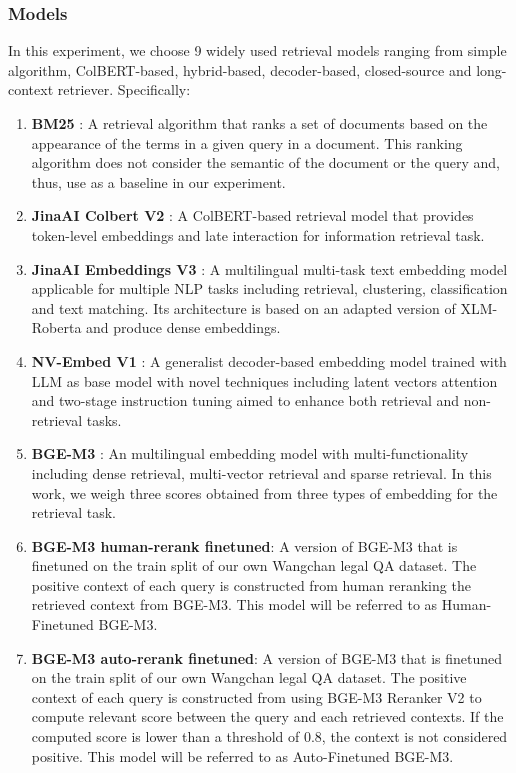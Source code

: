 \subsubsection{Models}
\label{subsubsec:re_models}
In this experiment, we choose 9 widely used retrieval models ranging from simple algorithm, ColBERT-based, hybrid-based, decoder-based, closed-source and long-context retriever. Specifically:
\begin{enumerate}
    \item \textbf{BM25} \cite{bm25}: A retrieval algorithm that ranks a set of documents based on the appearance of the terms in a given query in a document. This ranking algorithm does not consider the semantic of the document or the query and, thus, use as a baseline in our experiment.
    \item \textbf{JinaAI Colbert V2} \cite{jina-v2}: A ColBERT-based\cite{colbert} retrieval model that provides token-level embeddings and late interaction for information retrieval task.
    \item \textbf{JinaAI Embeddings V3} \cite{jina-v3}: A multilingual multi-task text embedding model applicable for multiple NLP tasks including retrieval, clustering, classification and text matching. Its architecture is based on an adapted version of XLM-Roberta and produce dense embeddings.
    \item \textbf{NV-Embed V1} \cite{nvembed}:  A generalist decoder-based embedding model trained with LLM as base model with novel techniques including latent vectors attention and two-stage instruction tuning aimed to enhance both retrieval and non-retrieval tasks.
    \item \textbf{BGE-M3} \cite{bge-m3}:  An multilingual embedding model with multi-functionality including dense retrieval, multi-vector retrieval and sparse retrieval. In this work, we weigh three scores obtained from three types of embedding for the retrieval task.
    \item \textbf{BGE-M3 human-rerank finetuned}: A version of BGE-M3 that is finetuned on the train split of our own Wangchan legal QA dataset. The positive context of each query is constructed from human reranking the retrieved context from BGE-M3. This model will be referred to as Human-Finetuned BGE-M3.
    \item \textbf{BGE-M3 auto-rerank finetuned}: A version of BGE-M3 that is finetuned on the train split of our own Wangchan legal QA dataset. The positive context of each query is constructed from using BGE-M3 Reranker V2\cite{} to compute relevant score between the query and each retrieved contexts. If the computed score is lower than a threshold of 0.8, the context is not considered positive. This model will be referred to as Auto-Finetuned BGE-M3.

\end{enumerate}
